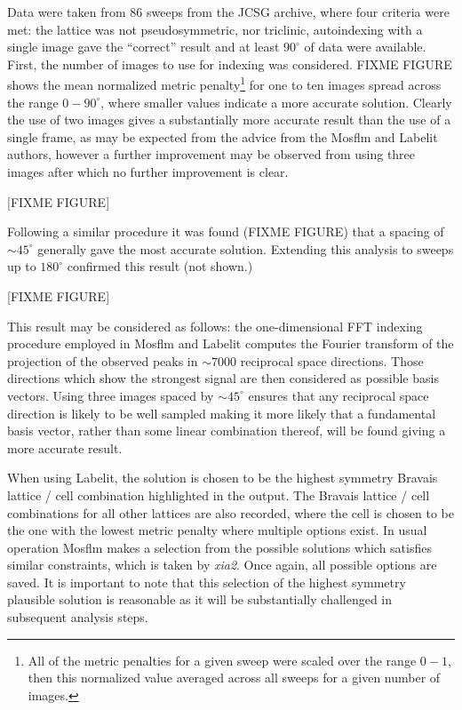 \documentclass[a4paper,11pt]{article}
\begin{document}
Data were taken from 86 sweeps from the JCSG archive, where four
criteria were met: the lattice was not pseudosymmetric, nor triclinic,
autoindexing with a single image gave the ``correct'' result and at
least $90^{\circ}$ of data were available. First, the number of images
to use for indexing was considered. FIXME FIGURE shows the mean
normalized metric penalty\footnote{All of the metric penalties for a
  given sweep were scaled over the range $0 - 1$, then this normalized
  value averaged across all sweeps for a given number of images.} for
one to ten images spread across the range $0 - 90^{\circ}$, where
smaller values indicate a more accurate solution. Clearly the use of
two images gives a substantially more accurate result than the use of
a single frame, as may be expected from the advice from the Mosflm and
Labelit authors, however a further improvement may be observed from
using three images after which no further improvement is clear. 

[FIXME FIGURE]

Following a similar procedure it was found (FIXME FIGURE) that a
spacing of $\sim 45^{\circ}$ generally gave the most accurate
solution. Extending this analysis to sweeps up to $180^{\circ}$
confirmed this result (not shown.) 

[FIXME FIGURE]

This result may be considered as follows: the one-dimensional FFT
indexing procedure employed in Mosflm and Labelit computes the
Fourier transform of the projection of the observed peaks in $\sim
7000$ reciprocal space directions. Those directions which show the
strongest signal are then considered as possible basis vectors. Using
three images spaced by $\sim 45^{\circ}$ ensures that any reciprocal
space direction is likely to be well sampled making it more likely
that a fundamental basis vector, rather than some linear combination
thereof, will be found giving a more accurate result.

When using Labelit, the solution is chosen to be the highest symmetry
Bravais lattice / cell combination highlighted in the output. The
Bravais lattice / cell combinations for all other lattices are also
recorded, where the cell is chosen to be the one with the lowest
metric penalty where multiple options exist. In usual operation Mosflm
makes a selection from the possible solutions which satisfies similar
constraints, which is taken by \emph{xia2}. Once again, all possible
options are saved. It is important to note that this selection of the
highest symmetry plausible solution is reasonable as it will be
substantially challenged in subsequent analysis steps.
\end{document}
